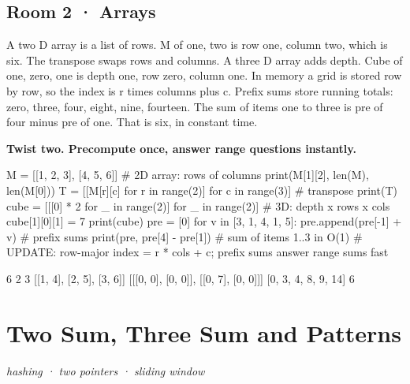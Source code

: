 \documentclass[11pt,a4paper]{report}
\begin{document}
\section*{Room 2 · Arrays}
A two D array is a list of rows. M of one, two is row one, column two, which is six. The transpose swaps rows and columns. A three D array adds depth. Cube of one, zero, one is depth one, row zero, column one. In memory a grid is stored row by row, so the index is r times columns plus c. Prefix sums store running totals: zero, three, four, eight, nine, fourteen. The sum of items one to three is pre of four minus pre of one. That is six, in constant time.
\begin{tcolorbox}[colback=yellow!12,colframe=orange!70!black,boxrule=0.4pt,left=4pt,right=4pt,top=2pt,bottom=2pt]\textbf{Twist two. Precompute once, answer range questions instantly.}\end{tcolorbox}
\begin{Code}
M = [[1, 2, 3], [4, 5, 6]]                  # 2D array: rows of columns
print(M[1][2], len(M), len(M[0]))
T = [[M[r][c] for r in range(2)] for c in range(3)]   # transpose
print(T)
cube = [[[0] * 2 for _ in range(2)] for _ in range(2)]   # 3D: depth x rows x cols
cube[1][0][1] = 7
print(cube)
pre = [0]
for v in [3, 1, 4, 1, 5]: pre.append(pre[-1] + v)     # prefix sums
print(pre, pre[4] - pre[1])                 # sum of items 1..3 in O(1)
# UPDATE: row-major index = r * cols + c; prefix sums answer range sums fast
\end{Code}
\begin{Out}
6 2 3
[[1, 4], [2, 5], [3, 6]]
[[[0, 0], [0, 0]], [[0, 7], [0, 0]]]
[0, 3, 4, 8, 9, 14] 6
\end{Out}
\chapter{Two Sum, Three Sum and Patterns}
\textit{hashing · two pointers · sliding window}
\end{document}
